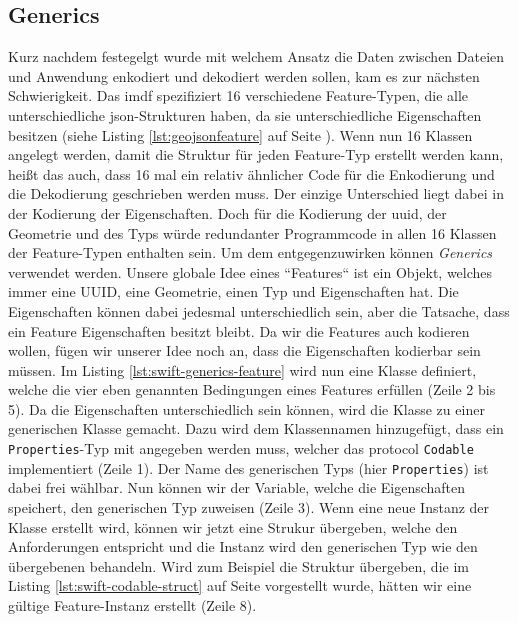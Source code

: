 \subsection{Generics}
\label{subsec:generics}
Kurz nachdem festegelgt wurde mit welchem Ansatz die Daten zwischen Dateien und Anwendung enkodiert und dekodiert werden sollen, kam es zur nächsten Schwierigkeit.
Das \acl{imdf} spezifiziert 16 verschiedene Feature-Typen, die alle unterschiedliche \ac{json}-Strukturen haben, da sie unterschiedliche Eigenschaften besitzen (siehe Listing \ref{lst:geojsonfeature} auf Seite \pageref{lst:geojsonfeature}).
Wenn nun 16 Klassen angelegt werden, damit die Struktur für jeden Feature-Typ erstellt werden kann, heißt das auch, dass 16 mal ein relativ ähnlicher Code für die Enkodierung und die Dekodierung geschrieben werden muss.
Der einzige Unterschied liegt dabei in der Kodierung der Eigenschaften.
Doch für die Kodierung der \ac{uuid}, der Geometrie und des Typs würde redundanter Programmcode in allen 16 Klassen der Feature-Typen enthalten sein.
Um dem entgegenzuwirken können \emph{Generics} verwendet werden.\pbreak%
%
Unsere globale Idee eines ``Features`` ist ein Objekt, welches immer eine UUID, eine Geometrie, einen Typ und Eigenschaften hat.
Die Eigenschaften können dabei jedesmal unterschiedlich sein, aber die Tatsache, dass ein Feature Eigenschaften besitzt bleibt.
Da wir die Features auch kodieren wollen, fügen wir unserer Idee noch an, dass die Eigenschaften kodierbar sein müssen.
Im Listing \ref{lst:swift-generics-feature} wird nun eine Klasse definiert, welche die vier eben genannten Bedingungen eines Features erfüllen (Zeile 2 bis 5).
Da die Eigenschaften unterschiedlich sein können, wird die Klasse zu einer generischen Klasse gemacht.
Dazu wird dem Klassennamen hinzugefügt, dass ein \texttt{Properties}-Typ mit angegeben werden muss, welcher das \Gls{protocol} \texttt{Codable} implementiert (Zeile 1).
Der Name des generischen Typs (hier \texttt{Properties}) ist dabei frei wählbar.
Nun können wir der Variable, welche die Eigenschaften speichert, den generischen Typ zuweisen (Zeile 3).\pbreak%
%
Wenn eine neue Instanz der Klasse erstellt wird, können wir jetzt eine Strukur übergeben, welche den Anforderungen entspricht und die Instanz wird den generischen Typ wie den übergebenen behandeln.
Wird zum Beispiel die Struktur übergeben, die im Listing \ref{lst:swift-codable-struct} auf Seite \pageref{lst:swift-codable-struct} vorgestellt wurde, hätten wir eine gültige Feature-Instanz erstellt (Zeile 8).
